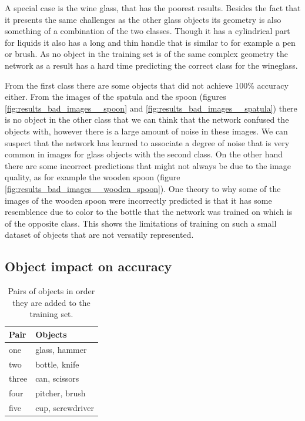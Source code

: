 A special case is the wine glass, that has the poorest results. Besides the fact that it presents the same challenges as the other glass objects its geometry is also something of a combination of the two classes. Though it has a cylindrical part for liquids it also has a long and thin handle that is similar to for example a pen or brush. As no object in the training set is of the same complex geometry the network as a result has a hard time predicting the correct class for the wineglass.

From the first class there are some objects that did not achieve 100\% accuracy either. From the images of the spatula and the spoon (figures \ref{fig:results_bad_images__spoon} and \ref{fig:results_bad_images__spatula}) there is no object in the other class that we can think that the network confused the objects with, however there is a large amount of noise in these images. We can suspect that the network has learned to associate a degree of noise that is very common in images for glass objects with the second class. On the other hand there are some incorrect predictions that might not always be due to the image quality, as for example the wooden spoon (figure \ref{fig:results_bad_images__wooden_spoon}). One theory to why some of the images of the wooden spoon were incorrectly predicted is that it has some resemblence due to color to the bottle that the network was trained on which is of the opposite class. This shows the limitations of training on such a small dataset of objects that are not versatily represented.


\subsection{Object impact on accuracy}
\label{sec:obj_impact}

\begin{table}
	\centering
	\begin{tabular}{l | l}
		\hline
		Pair  & Objects \\ \hline
		one   & glass, hammer \\
		two   & bottle, knife \\
		three & can, scissors \\
		four  & pitcher, brush \\
		five  & cup, screwdriver \\
		\hline
	\end{tabular}
	\caption{Pairs of objects in order they are added to the training set.}
	\label{tab:obj_pairs}
\end{table}

